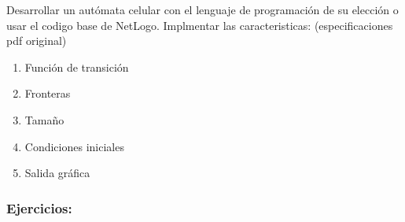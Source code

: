 \documentclass[12pt]{article}
\begin{document}
Desarrollar un autómata celular con el lenguaje de programación de su elección o usar el codigo base de NetLogo. Implmentar las caracteristicas: (especificaciones pdf original)\\

\begin{enumerate}
    \item Función de transición
    \item Fronteras
    \item Tamaño
    \item Condiciones iniciales
    \item Salida gráfica
\end{enumerate}
{\color{blue} \subsubsection*{Ejercicios:}}
\end{document}
